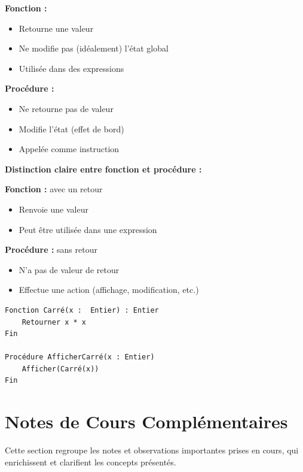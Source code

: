 \documentclass[12pt,a4paper]{article}
\begin{document}
\begin{important}
\textcolor{titrebleu}{\textbf{Fonction :}}
\begin{itemize}
    \item Retourne une valeur
    \item Ne modifie pas (idéalement) l'état global
    \item Utilisée dans des expressions
\end{itemize}

\textcolor{defvert}{\textbf{Procédure :}}
\begin{itemize}
    \item Ne retourne pas de valeur
    \item Modifie l'état (effet de bord)
    \item Appelée comme instruction
\end{itemize}
\end{important}

\begin{notecours}
\textbf{Distinction claire entre fonction et procédure :}

\textbf{Fonction : } avec un retour
\begin{itemize}
    \item Renvoie une valeur
    \item Peut être utilisée dans une expression
\end{itemize}

\textbf{Procédure :} sans retour
\begin{itemize}
    \item N'a pas de valeur de retour
    \item Effectue une action (affichage, modification, etc.)
\end{itemize}
\end{notecours}

\begin{exemple}
\begin{verbatim}
Fonction Carré(x :  Entier) : Entier
    Retourner x * x
Fin

Procédure AfficherCarré(x : Entier)
    Afficher(Carré(x))
Fin
\end{verbatim}
\end{exemple}

\newpage
\section{Notes de Cours Complémentaires}

Cette section regroupe les notes et observations importantes prises en cours, qui enrichissent et clarifient les concepts présentés.
\end{document}
